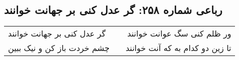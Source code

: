 \begin{center}
\section*{رباعی شماره ۲۵۸: گر عدل کنی بر جهانت خوانند}
\label{sec:sh258}
\begin{longtable}{l p{0.5cm} r}
گر عدل کنی بر جهانت خوانند
&&
ور ظلم کنی سگ عوانت خوانند
\\
چشم خردت باز کن و نیک ببین
&&
تا زین دو کدام به که آنت خوانند
\\
\end{longtable}
\end{center}
